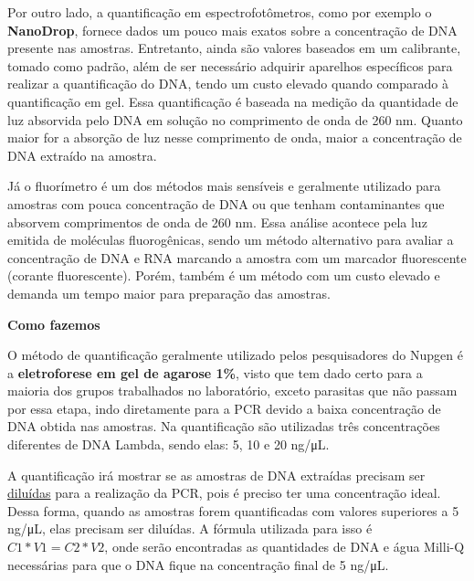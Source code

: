 \documentclass[
  letterpaper,
  DIV=11,
  numbers=noendperiod]{scrreprt}
\begin{document}
Por outro lado, a quantificação em espectrofotômetros, como por exemplo
o \textbf{NanoDrop}, fornece dados um pouco mais exatos sobre a
concentração de DNA presente nas amostras. Entretanto, ainda são valores
baseados em um calibrante, tomado como padrão, além de ser necessário
adquirir aparelhos específicos para realizar a quantificação do DNA,
tendo um custo elevado quando comparado à quantificação em gel. Essa
quantificação é baseada na medição da quantidade de luz absorvida pelo
DNA em solução no comprimento de onda de 260 nm. Quanto maior for a
absorção de luz nesse comprimento de onda, maior a concentração de DNA
extraído na amostra.

Já o fluorímetro é um dos métodos mais sensíveis e geralmente utilizado
para amostras com pouca concentração de DNA ou que tenham contaminantes
que absorvem comprimentos de onda de 260 nm. Essa análise acontece pela
luz emitida de moléculas fluorogênicas, sendo um método alternativo para
avaliar a concentração de DNA e RNA marcando a amostra com um marcador
fluorescente (corante fluorescente). Porém, também é um método com um
custo elevado e demanda um tempo maior para preparação das amostras.

\begin{tcolorbox}[enhanced jigsaw, colback=white, toprule=.15mm, rightrule=.15mm, opacityback=0, left=2mm, arc=.35mm, bottomrule=.15mm, breakable, leftrule=.75mm]
\begin{minipage}[t]{5.5mm}
\textcolor{quarto-callout-note-color}{\faInfo}
\end{minipage}%
\begin{minipage}[t]{\textwidth - 5.5mm}

\textbf{Como fazemos}\vspace{2mm}

O método de quantificação geralmente utilizado pelos pesquisadores do
Nupgen é a \textbf{eletroforese em gel de agarose 1\%}, visto que tem
dado certo para a maioria dos grupos trabalhados no laboratório, exceto
parasitas que não passam por essa etapa, indo diretamente para a PCR
devido a baixa concentração de DNA obtida nas amostras. Na quantificação
são utilizadas três concentrações diferentes de DNA Lambda, sendo elas:
5, 10 e 20 ng/μL.

\end{minipage}%
\end{tcolorbox}

A quantificação irá mostrar se as amostras de DNA extraídas precisam ser
\protect\hyperlink{diluiuxe7uxf5es}{diluídas} para a realização da PCR,
pois é preciso ter uma concentração ideal. Dessa forma, quando as
amostras forem quantificadas com valores superiores a 5 ng/μL, elas
precisam ser diluídas. A fórmula utilizada para isso é
\(C1 * V1 = C2 * V2\), onde serão encontradas as quantidades de DNA e
água Milli-Q necessárias para que o DNA fique na concentração final de 5
ng/μL.
\end{document}
